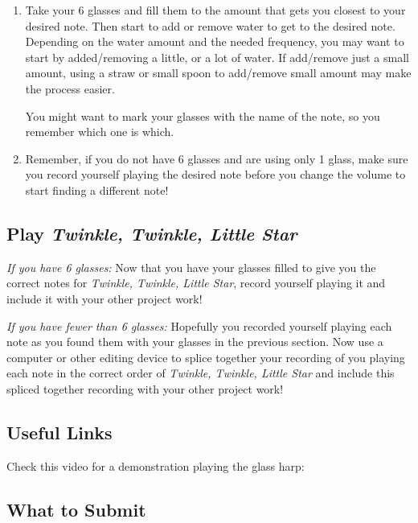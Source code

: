 \documentclass[12pt,noauthor,nooutcomes,hints,instructornotes]{ximera}%
\begin{document}
\begin{enumerate}
    \item Take your 6 glasses and fill them to the amount that gets you closest to your desired note.  Then start to add or remove water to get to the desired note.  Depending on the water amount and the needed frequency, you may want to start by added/removing a little, or a lot of water.  If add/remove just a small amount, using a straw or small spoon to add/remove small amount may make the process easier.
    
    You might want to mark your glasses with the name of the note, so you remember which one is which.
    
    \item Remember, if you do not have 6 glasses and are using only 1 glass, make sure you record yourself playing the desired note before you change the volume to start finding a different note!
    
\end{enumerate}


\subsection{Play \textit{Twinkle, Twinkle, Little Star}}

\textit{If you have 6 glasses:}  Now that you have your glasses filled to give you the correct notes for \textit{Twinkle, Twinkle, Little Star}, record yourself playing it and include it with your other project work!

\textit{If you have fewer than 6 glasses:} Hopefully you recorded yourself playing each note as you found them with your glasses in the previous section.  Now use a computer or other editing device to splice together your recording of you playing each note in the correct order of \textit{Twinkle, Twinkle, Little Star} and include this spliced together recording with your other project work!\\


\subsection{Useful Links}
Check this video for a demonstration playing the glass harp:


\subsection{What to Submit}
\end{document}
